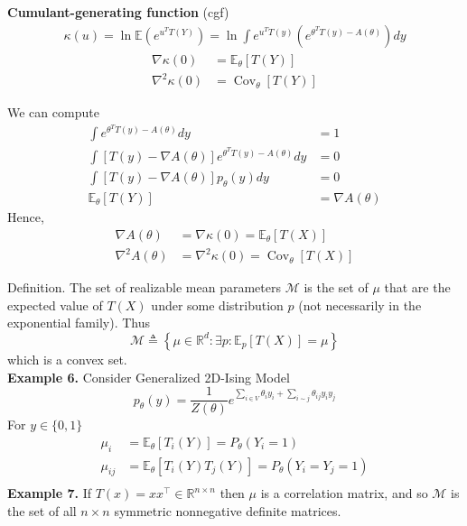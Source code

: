 \documentclass[11pt,a4paper]{article}
\begin{document}
\textbf{Cumulant-generating function} (cgf)
\begin{equation}
    \begin{aligned}
        \kappa(u)=\ln \mathbb{E}(e^{u^TT(Y)})=\ln \int e^{u^TT(y)}(e^{\theta^T T(y)-A(\theta)}) dy
    \end{aligned}
    \nonumber
\end{equation}
\begin{equation}
    \begin{aligned}
    \nabla \kappa(0)&=\mathbb{E}_\theta[T(Y)] \\
    \nabla^2 \kappa(0)&=\operatorname{Cov}_\theta[T(Y)]
    \end{aligned}
    \nonumber
\end{equation}

We can compute
\begin{equation}
    \begin{aligned}
        \int e^{\theta^T T(y)-A(\theta)} dy&=1\\
        \int [T(y)-\nabla A(\theta)] e^{\theta^T T(y)-A(\theta)} dy&=0\\
        \int[T(y)-\nabla A(\theta)]p_\theta(y) dy&=0\\
        \mathbb{E}_\theta [T(Y)]&=\nabla A(\theta)
    \end{aligned}
    \nonumber
\end{equation}
Hence,
\begin{equation}
    \begin{aligned}
    \nabla A(\theta) &=\nabla \kappa(0)=\mathbb{E}_\theta[T(X)] \\
    \nabla^2 A(\theta) &=\nabla^2 \kappa(0)=\operatorname{Cov}_\theta[T(X)]
    \end{aligned}
    \nonumber
\end{equation}

Definition. The set of realizable mean parameters $\mathcal{M}$ is the set of $\mu$ that are the expected value of $T(X)$ under some distribution $p$ (not necessarily in the exponential family). Thus
$$
\mathcal{M} \triangleq\left\{\mu \in \mathbb{R}^d: \exists p: \mathbb{E}_p[T(X)]=\mu\right\}
$$
which is a convex set.\\

\textbf{Example 6.} Consider Generalized 2D-Ising Model $$p_\theta(y)=\frac{1}{Z(\theta)}e^{\sum_{i\in V}\theta_i y_i +\sum _{i\sim j}\theta_{ij} y_iy_j}$$
For $y\in\{0,1\}$
\begin{equation}
    \begin{aligned}
        \mu_i&=\mathbb{E}_\theta \left[T_i(Y)\right]=P_\theta (Y_i=1)\\
        \mu_{ij}&=\mathbb{E}_\theta \left[T_i(Y)T_j(Y)\right]=P_\theta (Y_i=Y_j=1)\\
    \end{aligned}
    \nonumber
\end{equation}
\textbf{Example 7.} If $T(x)=x x^{\top} \in \mathbb{R}^{n \times n}$ then $\mu$ is a correlation matrix, and so $\mathcal{M}$ is the set of all $n \times n$ symmetric nonnegative definite matrices.
\end{document}
